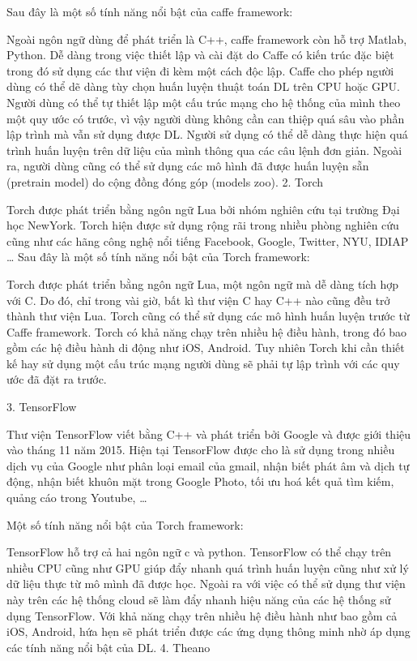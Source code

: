 Sau đây là một số tính năng nổi bật của caffe framework:

Ngoài ngôn ngữ dùng để phát triển là C++, caffe framework còn hỗ trợ Matlab, Python.
Dễ dàng trong việc thiết lập và cài đặt do Caffe có kiến trúc đặc biệt trong đó sử dụng các thư viện đi kèm một cách độc lập.
Caffe cho phép người dùng có thể dẽ dàng tùy chọn huấn luyện thuật toán DL trên CPU hoặc GPU.
Người dùng có thể tự thiết lập một cấu trúc mạng cho hệ thống của mình theo một quy ước có trước, vì vậy người dùng không cần can thiệp quá sâu vào phần lập trình mà vẫn sử dụng được DL.
Người sử dụng có thể dễ dàng thực hiện quá trình huấn luyện trên dữ liệu của mình thông qua các câu lệnh đơn giản. Ngoài ra, người dùng cũng có thể sử dụng các mô hình đã được huấn luyện sẵn (pretrain model) do cộng đồng đóng góp (models zoo).
2. Torch

Torch được phát triển bằng ngôn ngữ Lua bởi nhóm nghiên cứu tại trường Đại học NewYork. Torch hiện được sử dụng rộng rãi trong nhiều phòng nghiên cứu cũng như các hãng công nghệ nổi tiếng Facebook, Google, Twitter, NYU, IDIAP …
Sau đây là một số tính năng nổi bật của Torch framework:

Torch được phát triển bằng ngôn ngữ Lua, một ngôn ngữ mà dễ dàng tích hợp với C. Do đó, chỉ trong vài giờ, bất kì thư viện C hay C++ nào cũng đều trở thành thư viện Lua.
Torch cũng có thể sử dụng các mô hình huấn luyện trước từ Caffe framework.
Torch có khả năng chạy trên nhiều hệ điều hành, trong đó bao gồm các hệ điều hành di động như iOS, Android.
Tuy nhiên Torch khi cần thiết kế hay sử dụng một cấu trúc mạng người dùng sẽ phải tự lập trình với các quy ước đã đặt ra trước.

3. TensorFlow

Thư viện TensorFlow viết bằng C++ và phát triển bởi Google và được giới thiệu vào tháng 11 năm 2015. Hiện tại TensorFlow được cho là sử dụng trong nhiều dịch vụ của Google như phân loại email của gmail, nhận biết phát âm và dịch tự động, nhận biết khuôn mặt trong Google Photo, tối ưu hoá kết quả tìm kiếm, quảng cáo trong Youtube, …

Một số tính năng nổi bật của Torch framework:

TensorFlow hỗ trợ cả hai ngôn ngữ c và python.
TensorFlow có thể chạy trên nhiều CPU cũng như GPU giúp đẩy nhanh quá trình huấn luyện cũng như xử lý dữ liệu thực từ mô mình đã được học. Ngoài ra với việc có thể sử dụng thư viện này trên các hệ thống cloud sẽ làm đẩy nhanh hiệu năng của các hệ thống sử dụng TensorFlow.
Với khả năng chạy trên nhiều hệ điều hành như bao gồm cả iOS, Android, hứa hẹn sẽ phát triển được các ứng dụng thông minh nhờ áp dụng các tính năng nổi bật của DL.
4. Theano

